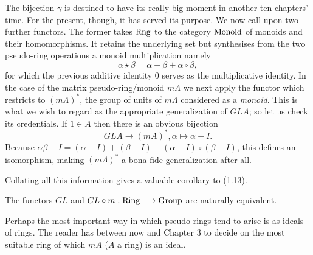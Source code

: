 The bijection $\gamma$ is destined to have its really big moment in another ten chapters' time. For the present, though, it has served its purpose. We now call upon two further functors. The former takes ${\rm Rng}$ to the category ${\rm Monoid}$ of monoids and their homomorphisms. It retains the underlying set but synthesises from the two pseudo-ring operations a monoid multiplication namely 
\[\alpha \star \beta=\alpha+\beta+\alpha\circ \beta,\]
for which the previous additive identity $0$ serves as the multiplicative identity. In the case of the matrix pseudo-ring/monoid $m\Lambda$ we next apply the functor which restricts to $(m\Lambda)^*$, the group of units of $m\Lambda$ considered as a {\em monoid}. This is what we wish to regard as the appropriate generalization of $GLA$; so let us check its credentials. If $1\in A$ then there is an obvious bijection
\[GLA\longrightarrow (mA)^*,\alpha\mapsto \alpha-I.\]
Because $\alpha\beta-I=(\alpha-I)+(\beta-I)+(\alpha-I)\circ(\beta-I)$, this defines an isomorphism, making $(m\Lambda)^*$ a bona fide generalization after all.

Collating all this information gives a valuable corollary to (1.13).
\begin{prop}
The functors $GL$ and $GL\circ m:{\rm Ring}\longrightarrow{\rm Group}$ are naturally equivalent.
\end{prop}
Perhaps the most important way in which pseudo-rings tend to arise is as ideals of rings. The reader has between now and Chapter 3 to decide on the most suitable ring of which $mA$ ($A$ a ring) is an ideal.
